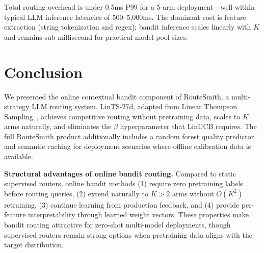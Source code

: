 \documentclass[11pt]{article}
\begin{document}
Total routing overhead is under 0.5ms P99 for a 5-arm deployment---well within typical LLM inference latencies of 500--5,000ms. The dominant cost is feature extraction (string tokenization and regex); bandit inference scales linearly with $K$ and remains sub-millisecond for practical model pool sizes.

\section{Conclusion}
\label{sec:conclusion}

We presented the online contextual bandit component of RouteSmith, a multi-strategy LLM routing system. LinTS-27d, adapted from Linear Thompson Sampling~\cite{abeille2017linear}, achieves competitive routing without pretraining data, scales to $K$ arms naturally, and eliminates the $\beta$ hyperparameter that LinUCB requires. The full RouteSmith product additionally includes a random forest quality predictor and semantic caching for deployment scenarios where offline calibration data is available.

\textbf{Structural advantages of online bandit routing.} Compared to static supervised routers, online bandit methods (1) require zero pretraining labels before routing queries, (2) extend naturally to $K > 2$ arms without $O(K^2)$ retraining, (3) continue learning from production feedback, and (4) provide per-feature interpretability through learned weight vectors. These properties make bandit routing attractive for zero-shot multi-model deployments, though supervised routers remain strong options when pretraining data aligns with the target distribution.
\end{document}
